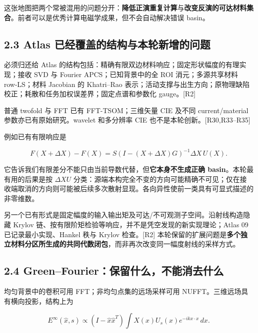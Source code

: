 \documentclass[11pt,a4paper]{article}
\begin{document}
这张地图把两个常被混用的问题分开：\textbf{降低正演重复计算}与\textbf{改变反演的可达材料集合}。前者可以是优秀计算电磁学成果，但不会自动解决错误
basin。

\hypertarget{atlas-ux5df2ux7ecfux8986ux76d6ux7684ux7ed3ux6784ux4e0eux672cux8f6eux65b0ux589eux7684ux95eeux9898}{%
\subsection{2.3 Atlas
已经覆盖的结构与本轮新增的问题}\label{atlas-ux5df2ux7ecfux8986ux76d6ux7684ux7ed3ux6784ux4e0eux672cux8f6eux65b0ux589eux7684ux95eeux9898}}

必须归还给 Atlas
的结构包括：精确有限双边材料响应；固定形状幅度的有理实现；接收 SVD 与
Fourier APCS；已知背景中的全 ROI 消元；多源共享材料 row-LS；材料
Jacobian 的 Khatri--Rao
表示；活动支撑与出生方向；原物理缺陷校正；耗散和任务加权误差界；固定点谱和参数化
gauge。{[}R2{]}

普通 twofold 与 FFT 已有 FFT-TSOM；三维矢量 CIE 及不同 current/material
参数亦已有原始研究。wavelet 和多分辨率 CIE
也不是本轮创新。{[}R30,R33--R35{]}

例如已有有限响应是

\[
F(X+\Delta X)-F(X)
=S(I-(X+\Delta X)G)^{-1}\Delta X\,U(X).
\]

它告诉我们有限差分不能只由当前导数代替，但\textbf{它本身不生成正确
basin}。本轮最有用的后果是按 \(\Delta XU\)
分类：源端本构完全不变的方向可能精确不可见；仅在接收端取消的方向则可能被后续多次散射显现。各向异性使前一类具有可显式描述的非零维数。

另一个已有形式是固定幅度的输入输出矩及可达/不可观测子空间。沿射线构造隐藏
Krylov 链、按有限阶矩检验等响应，并不是凭空发现的新实现理论；Atlas 09
已记录最小实现、Hankel 秩与 Krylov 检查。{[}R2{]}
本轮保留的扩展问题是\textbf{多个独立材料分区所生成的共同代数闭包}，而非再次改变同一幅度射线的采样方式。

\hypertarget{greenfourierux4fddux7559ux4ec0ux4e48ux4e0dux80fdux6d88ux53bbux4ec0ux4e48}{%
\subsection{2.4
Green--Fourier：保留什么，不能消去什么}\label{greenfourierux4fddux7559ux4ec0ux4e48ux4e0dux80fdux6d88ux53bbux4ec0ux4e48}}

均匀背景中的卷积可用 FFT；非均匀点集的远场采样可用
NUFFT。三维远场具有横向投影，结构上为

\[
E^\infty(\widehat x,s)
\propto (I-\widehat x\widehat x^T)
\int X(x)U_s(x)e^{-ik\widehat x\cdot x}\,dx.
\]
\end{document}
